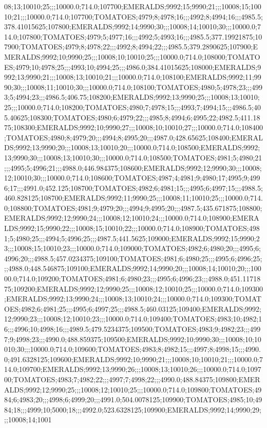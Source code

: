 08;13;10010;25;;;10000.0;714.0;107700;EMERALDS;9992;15;9990;21;;;10008;15;10010;21;;;10000.0;714.0;107700;TOMATOES;4979;8;4978;16;;;4992;8;4994;16;;;4985.5;378.41015625;107800;EMERALDS;9992;14;9990;30;;;10008;14;10010;30;;;10000.0;714.0;107800;TOMATOES;4979;5;4977;16;;;4992;5;4993;16;;;4985.5;377.19921875;107900;TOMATOES;4979;8;4978;22;;;4992;8;4994;22;;;4985.5;379.2890625;107900;EMERALDS;9992;10;9990;25;;;10008;10;10010;25;;;10000.0;714.0;108000;TOMATOES;4979;10;4978;25;;;4993;10;4994;25;;;4986.0;384.41015625;108000;EMERALDS;9992;13;9990;21;;;10008;13;10010;21;;;10000.0;714.0;108100;EMERALDS;9992;11;9990;30;;;10008;11;10010;30;;;10000.0;714.0;108100;TOMATOES;4980;5;4978;23;;;4993;5;4994;23;;;4986.5;406.75;108200;EMERALDS;9992;13;9990;25;;;10008;13;10010;25;;;10000.0;714.0;108200;TOMATOES;4980;7;4978;15;;;4993;7;4994;15;;;4986.5;405.40625;108300;TOMATOES;4980;6;4979;22;;;4985;8;4994;6;4995;22;4982.5;411.1875;108300;EMERALDS;9992;10;9990;27;;;10008;10;10010;27;;;10000.0;714.0;108400;TOMATOES;4980;8;4979;20;;;4994;8;4995;20;;;4987.0;428.65625;108400;EMERALDS;9992;13;9990;20;;;10008;13;10010;20;;;10000.0;714.0;108500;EMERALDS;9992;13;9990;30;;;10008;13;10010;30;;;10000.0;714.0;108500;TOMATOES;4981;5;4980;21;;;4995;5;4996;21;;;4988.0;446.984375;108600;EMERALDS;9992;12;9990;30;;;10008;12;10010;30;;;10000.0;714.0;108600;TOMATOES;4987;4;4981;9;4980;17;4995;9;4996;17;;;4991.0;452.125;108700;TOMATOES;4982;6;4981;15;;;4995;6;4997;15;;;4988.5;460.828125;108700;EMERALDS;9992;11;9990;25;;;10008;11;10010;25;;;10000.0;714.0;108800;TOMATOES;4981;9;4979;20;;;4994;9;4995;20;;;4987.5;435.671875;108800;EMERALDS;9992;12;9990;24;;;10008;12;10010;24;;;10000.0;714.0;108900;EMERALDS;9992;15;9990;22;;;10008;15;10010;22;;;10000.0;714.0;108900;TOMATOES;4981;5;4980;25;;;4994;5;4996;25;;;4987.5;441.5625;109000;EMERALDS;9992;15;9990;23;;;10008;15;10010;23;;;10000.0;714.0;109000;TOMATOES;4982;6;4980;20;;;4995;6;4996;20;;;4988.5;457.0234375;109100;TOMATOES;4981;6;4980;25;;;4995;6;4996;25;;;4988.0;448.546875;109100;EMERALDS;9992;14;9990;20;;;10008;14;10010;20;;;10000.0;714.0;109200;TOMATOES;4981;6;4980;23;;;4995;6;4996;23;;;4988.0;451.1171875;109200;EMERALDS;9992;12;9990;25;;;10008;12;10010;25;;;10000.0;714.0;109300;EMERALDS;9992;13;9990;24;;;10008;13;10010;24;;;10000.0;714.0;109300;TOMATOES;4982;6;4981;25;;;4995;6;4997;25;;;4988.5;460.03125;109400;EMERALDS;9992;12;9990;23;;;10008;12;10010;23;;;10000.0;714.0;109400;TOMATOES;4983;10;4982;16;;;4996;10;4998;16;;;4989.5;479.5234375;109500;TOMATOES;4983;9;4982;23;;;4997;9;4998;23;;;4990.0;488.859375;109500;EMERALDS;9992;10;9990;30;;;10008;10;10010;30;;;10000.0;714.0;109600;TOMATOES;4983;8;4982;15;;;4997;8;4998;15;;;4990.0;491.6328125;109600;EMERALDS;9992;10;9990;21;;;10008;10;10010;21;;;10000.0;714.0;109700;EMERALDS;9992;13;9990;26;;;10008;13;10010;26;;;10000.0;714.0;109700;TOMATOES;4983;7;4982;22;;;4997;7;4998;22;;;4990.0;488.84375;109800;EMERALDS;9992;12;9990;25;;;10008;12;10010;25;;;10000.0;714.0;109800;TOMATOES;4984;6;4983;20;;;4998;6;4999;20;;;4991.0;504.0078125;109900;TOMATOES;4985;10;4984;18;;;4999;10;5000;18;;;4992.0;523.6328125;109900;EMERALDS;9992;14;9990;29;;;10008;14;1001